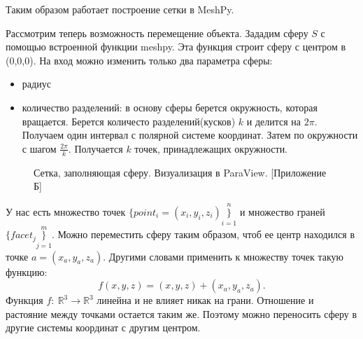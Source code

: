 Таким образом работает построение сетки в MeshPy.

Рассмотрим теперь возможность перемещение объекта. Зададим сферу $S$ с помощью встроенной функции meshpy. Эта функция строит сферу с центром в (0,0,0). На вход можно изменить только два параметра сферы:
\begin{itemize}
    \item радиус
    \item количество разделений: в основу сферы берется окружность, которая вращается. Берется количесто разделений(кусков) $k$ и делится на $2\pi$. Получаем один интервал с полярной системе координат. Затем по окружности с шагом $\frac{2\pi}{k}$. Получается $k$ точек, принадлежащих окружности.
\end{itemize}

 \begin{figure}[H]
 	\caption{Сетка, заполняющая сферу. Визуализация в ParaView. [Приложение Б]}
 	\label{fig:sphere}
 \end{figure}

У нас есть множество точек $\{point_{i}= (x_{i},y_{i},z_{i})\}\limits_{i = 1}^{n}$  и множество граней $\{facet_{j}\}\limits_{j = 1}^{m}$. Можно переместить сферу таким образом, чтоб ее центр находился в точке $a= (x_{a},y_{a},z_{a})$. Другими словами применить к множеству точек такую функцию:
 $$f(x,y,z) = (x,y,z) + (x_{a},y_{a},z_{a}).$$
Функция $f:~ \mathbb{R}^{3}\rightarrow \mathbb{R}^{3}$ линейна и не влияет никак на грани. Отношение и растояние между точками остается таким же. Поэтому можно переносить сферу в другие системы координат с другим центром. 

